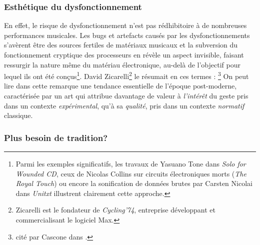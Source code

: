 	
\subsubsection{Esthétique du dysfonctionnement}

\noindent En effet, le risque de dysfonctionnement n'est pas rédhibitoire à de nombreuses performances musicales. Les bugs et artefacts causés par les dysfonctionnements s'avèrent être des sources fertiles de matériaux musicaux et la subversion du fonctionnement cryptique des processeurs en révèle un aspect invisible, faisant ressurgir la nature même du matériau électronique, au-delà de l'objectif pour lequel ils ont été conçus\footnote{Parmi les exemples significatifs, les travaux de Yasuano Tone dans \textit{Solo for Wounded CD}, ceux de Nicolas Collins sur circuits électroniques morts (\textit{The Royal Touch}) ou encore la sonification de données brutes par Carsten Nicolai dans \textit{Unitxt} illustrent clairement cette approche.}. David Zicarelli\footnote{Zicarelli est le fondateur de \textit{Cycling'74}, entreprise développant et commercialisant le logiciel Max.} le résumait en ces termes : \footnote{ cité par Cascone dans \cite{cascone_aesthetics_2000}.} On peut lire dans cette remarque une tendance essentielle de l'époque post-moderne, caractérisée par un art qui attribue davantage de valeur à \textit{l'intérêt} du geste pris dans un contexte \textit{expérimental}, qu'à sa \textit{qualité}, pris dans un contexte \textit{normatif} classique.

\subsubsection{Plus besoin de tradition?}

